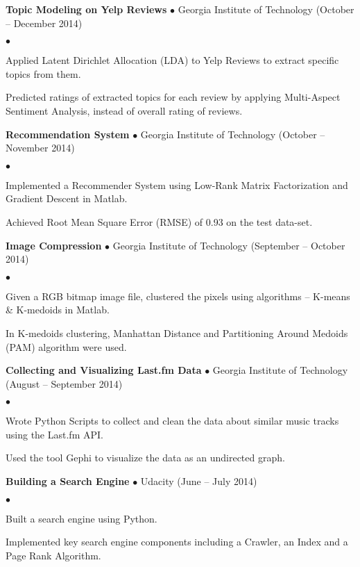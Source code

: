 \documentclass[10pt]{article}
\newcommand{\project}[3]{{ \textbf{#1} $\bullet$ #2 \hfill (#3)\\  }}
\newenvironment{achievements}{\begin{list}{$\bullet$}{\topsep 0pt \itemsep 0pt}}{\end{list}}
\begin{document}
\project{Topic Modeling on Yelp Reviews}{Georgia Institute of Technology}{October -- December 2014}
	\begin{achievements}
	\item Applied Latent Dirichlet Allocation (LDA) to Yelp Reviews to extract specific topics from them.
	\item Predicted ratings of extracted topics for each review by applying Multi-Aspect Sentiment Analysis, instead of overall rating of reviews.
	\end{achievements}	
	
\project{Recommendation System}{Georgia Institute of Technology}{October -- November 2014}
	\begin{achievements}
	\item Implemented a Recommender System using Low-Rank Matrix Factorization and Gradient Descent in Matlab.
	\item Achieved Root Mean Square Error (RMSE) of 0.93 on the test data-set.
	\end{achievements}	

\project{Image Compression}{Georgia Institute of Technology}{September -- October 2014}
	\begin{achievements}
	\item Given a RGB bitmap image file, clustered the pixels using algorithms -- K-means \& K-medoids in Matlab.
	\item In K-medoids clustering, Manhattan Distance and Partitioning Around Medoids (PAM) algorithm were used.
	\end{achievements}	

\project{Collecting and Visualizing Last.fm Data}{Georgia Institute of Technology}{August -- September 2014}
	\begin{achievements}
	\item Wrote Python Scripts to collect and clean the data about similar music tracks using the Last.fm API.
	\item Used the tool Gephi to visualize the data as an undirected graph.
	\end{achievements}	

\project{Building a Search Engine}{Udacity}{June -- July 2014}
	\begin{achievements}
	\item Built a search engine using Python.
	\item Implemented key search engine components including a Crawler, an Index and a Page Rank Algorithm.
	\end{achievements}
	
\end{document}
